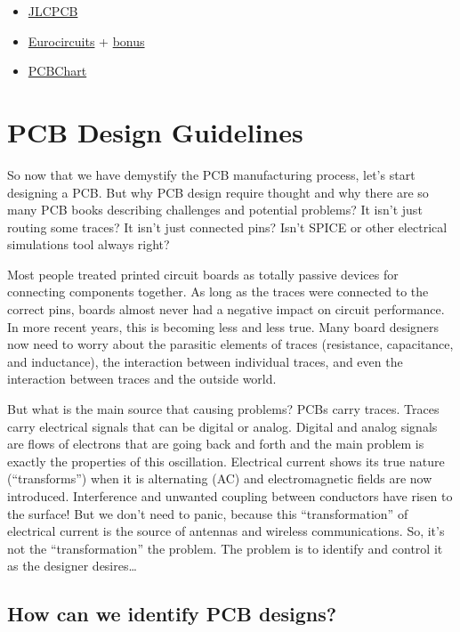 \documentclass[final]{cubedoc}
\begin{document}
	\begin{itemize}
		\item \href{https://www.youtube.com/watch?v=ljOoGyCso8s&t=311s}{JLCPCB}
		\item \href{https://www.eurocircuits.com/making-a-pcb-pcb-manufacture-step-by-step/}{Eurocircuits} + \href{https://www.youtube.com/watch?v=sIV0icM_Ujo&t=436s}{bonus}
		\item \href{https://www.pcbcart.com/article/content/PCB-manufacturing-process.html}{PCBChart}
	\end{itemize}
	
	\section{PCB Design Guidelines}
	
	So now that we have demystify the PCB manufacturing process, let’s start designing a PCB. But why PCB design require thought and why there are so many PCB books describing challenges and potential problems? It isn’t just routing some traces? It isn’t just connected pins? Isn’t SPICE or other electrical simulations tool always right? 
	
	Most people treated printed circuit boards as totally passive devices for connecting components together. As long as the traces were connected to the correct pins, boards almost never had a negative impact on circuit performance. In more recent years, this is becoming less and less true. Many board designers now need to worry about the parasitic elements of traces (resistance, capacitance, and inductance), the interaction between individual traces, and even the interaction between traces and the outside world. 
	
	But what is the main source that causing problems? PCBs carry traces. Traces carry electrical signals that can be digital or analog. Digital and analog signals are flows of electrons that are going back and forth and the main problem is exactly the properties of this oscillation. Electrical current shows its true nature (“transforms”) when it is alternating (AC) and electromagnetic fields are now introduced. Interference and unwanted coupling between conductors have risen to the surface! But we don’t need to panic, because this “transformation” of electrical current is the source of antennas and wireless communications. So, it’s not the “transformation” the problem. The problem is to identify and control it as the designer desires… 
	
	\subsection{How can we identify PCB designs?}
	
\end{document}
